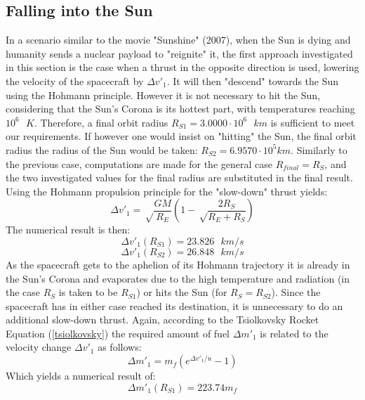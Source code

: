 \documentclass[onecolumn,12pt]{article}
\numberwithin{equation}{section}
\begin{document}
\subsection{Falling into the Sun}
In a scenario similar to the movie "Sunshine" (2007), when the Sun is dying and humanity sends a nuclear payload to "reignite" it, the first approach investigated in this section is the case when a thrust in the opposite direction is used, lowering the velocity of the spacecraft by $\Delta v'_1$. It will then "descend" towards the Sun using the Hohmann principle. However it is not necessary to hit the Sun, considering that the Sun's Corona is its hottest part, with temperatures reaching $10^6 \text{ } K$. Therefore, a final orbit radius $R_{S1} = 3.0000 \cdot 10^6 \text{ }km$ is sufficient to meet our requirements. If however one would insist on "hitting" the Sun, the final orbit radius the radius of the Sun would be taken: $R_{S2} = 6.9570 \cdot 10^5 km$. Similarly to the previous case, computations are made for the general case $R_{final} = R_S$, and the two investigated values for the final radius are substituted in the final result. Using the Hohmann propulsion principle for the "slow-down" thrust yields:
\begin{equation}
    \Delta v'_1 = \sqrt\frac{GM}{R_E}\left(1 - \sqrt\frac{2R_S}{R_E+R_S}\right) 
\end{equation}
The numerical result is then:
\begin{equation}
    \Delta v'_1 (R_{S1}) = 23.826 \text{ } km/s
\end{equation}
\begin{equation}
    \Delta v'_1 (R_{S2}) = 26.848 \text{ } km/s
\end{equation}
As the spacecraft gets to the aphelion of its Hohmann trajectory it is already in the Sun's Corona and evaporates due to the high temperature and radiation (in the case $R_S$ is taken to be $R_{S1}$) or hits the Sun (for $R_S = R_{S2}$). Since the spacecraft has in either case reached its destination, it is unnecessary to do an additional slow-down thrust.  Again, according to the Tsiolkovsky Rocket Equation (\ref{tsiolkovsky}) the required amount of fuel $\Delta m'_1$ is related to the velocity change $\Delta v'_1$ as follows:
\begin{equation}
    \Delta m'_1 = m_f (e^{\Delta v'_1/u}-1)
\end{equation}
Which yields a numerical result of:
\begin{equation}
    \Delta m'_1 (R_{S1}) = 223.74 m_f
    \label{gandon1}
\end{equation}
\end{document}
